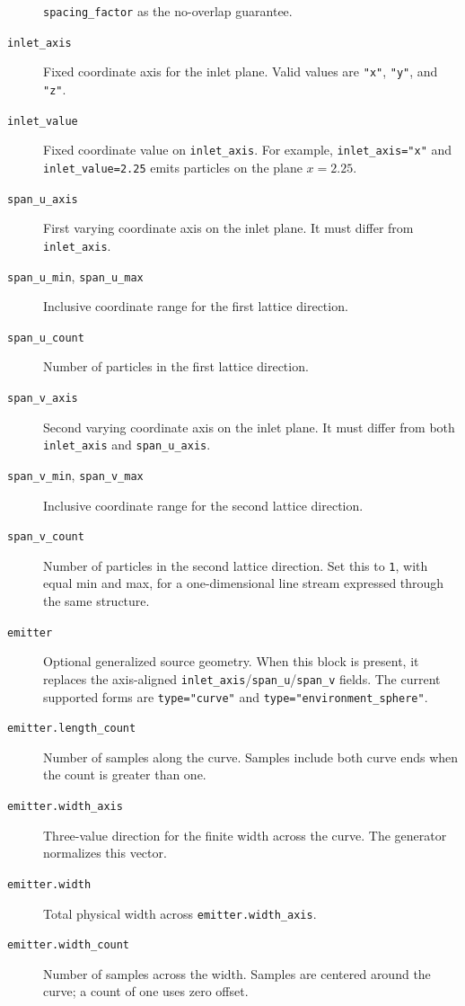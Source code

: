 \begin{description}
    \texttt{spacing\_factor} as the no-overlap guarantee.
    \item[\texttt{inlet\_axis}] Fixed coordinate axis for the inlet plane.
    Valid values are \texttt{"x"}, \texttt{"y"}, and \texttt{"z"}.
    \item[\texttt{inlet\_value}] Fixed coordinate value on
    \texttt{inlet\_axis}.  For example, \texttt{inlet\_axis="x"} and
    \texttt{inlet\_value=2.25} emits particles on the plane \(x=2.25\).
    \item[\texttt{span\_u\_axis}] First varying coordinate axis on the inlet
    plane.  It must differ from \texttt{inlet\_axis}.
    \item[\texttt{span\_u\_min}, \texttt{span\_u\_max}] Inclusive coordinate
    range for the first lattice direction.
    \item[\texttt{span\_u\_count}] Number of particles in the first lattice
    direction.
    \item[\texttt{span\_v\_axis}] Second varying coordinate axis on the inlet
    plane.  It must differ from both \texttt{inlet\_axis} and
    \texttt{span\_u\_axis}.
    \item[\texttt{span\_v\_min}, \texttt{span\_v\_max}] Inclusive coordinate
    range for the second lattice direction.
    \item[\texttt{span\_v\_count}] Number of particles in the second lattice
    direction.  Set this to \texttt{1}, with equal min and max, for a
    one-dimensional line stream expressed through the same structure.
    \item[\texttt{emitter}] Optional generalized source geometry.  When this
    block is present, it replaces the axis-aligned
    \texttt{inlet\_axis}/\texttt{span\_u}/\texttt{span\_v} fields.
    The current supported forms are \texttt{type="curve"} and
    \texttt{type="environment\_sphere"}.
    \item[\texttt{emitter.length\_count}] Number of samples along the curve.
    Samples include both curve ends when the count is greater than one.
    \item[\texttt{emitter.width\_axis}] Three-value direction for the finite
    width across the curve.  The generator normalizes this vector.
    \item[\texttt{emitter.width}] Total physical width across
    \texttt{emitter.width\_axis}.
    \item[\texttt{emitter.width\_count}] Number of samples across the width.
    Samples are centered around the curve; a count of one uses zero offset.

\end{description}
